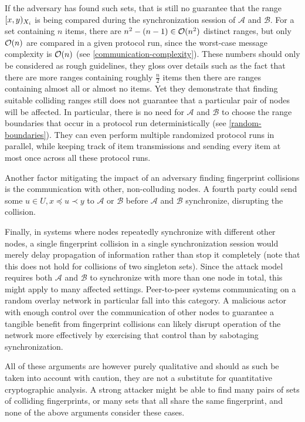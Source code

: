 \label{why-random-boundaries}
If the adversary has found such sets, that is still no guarantee that the range $[{x},{y})_{X_i}$ is being compared during the synchronization session of $\mathcal{A}$ and $\mathcal{B}$. For a set containing $n$ items, there are $n^2 - (n - 1) \in \mathcal{O}(n^2)$ distinct ranges, but only $\mathcal{O}(n)$ are compared in a given protocol run, since the worst-case message complexity is $\mathcal{O}(n)$ (see \cref{communication-complexity}). These numbers should only be considered as rough guidelines, they gloss over details such as the fact that there are more ranges containing roughly $\frac{n}{2}$ items then there are ranges containing almost all or almost no items. Yet they demonstrate that finding suitable colliding ranges still does not guarantee that a particular pair of nodes will be affected. In particular, there is no need for $\mathcal{A}$ and $\mathcal{B}$ to choose the range boundaries that occur in a protocol run deterministically (see \cref{random-boundaries}). They can even perform multiple randomized protocol runs in parallel, while keeping track of item transmissions and sending every item at most once across all these protocol runs.

Another factor mitigating the impact of an adversary finding fingerprint collisions is the communication with other, non-colluding nodes. A fourth party could send some $u \in U, x \preceq u \prec y$ to $\mathcal{A}$ or $\mathcal{B}$ before $\mathcal{A}$ and $\mathcal{B}$ synchronize, disrupting the collision.

Finally, in systems where nodes repeatedly synchronize with different other nodes, a single fingerprint collision in a single synchronization session would merely delay propagation of information rather than stop it completely (note that this does not hold for collisions of two singleton sets). Since the attack model requires both $\mathcal{A}$ and $\mathcal{B}$ to synchronize with more than one node in total, this might apply to many affected settings. Peer-to-peer systems communicating on a random overlay network in particular fall into this category. A malicious actor with enough control over the communication of other nodes to guarantee a tangible benefit from fingerprint collisions can likely disrupt operation of the network more effectively by exercising that control than by sabotaging synchronization.

All of these arguments are however purely qualitative and should as such be taken into account with caution, they are not a substitute for quantitative cryptographic analysis. A strong attacker might be able to find many pairs of sets of colliding fingerprints, or many sets that all share the same fingerprint, and none of the above arguments consider these cases.

